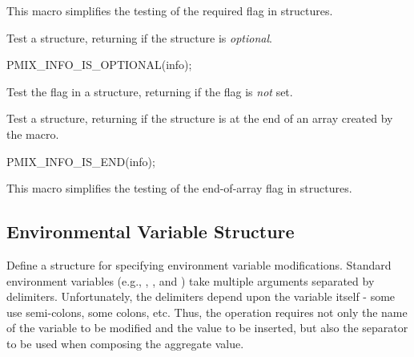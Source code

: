 This macro simplifies the testing of the required flag in  structures.


Test a  structure, returning  if the structure is \textit{optional}.

\cspecificstart
\begin{codepar}
PMIX_INFO_IS_OPTIONAL(info);
\end{codepar}
\cspecificend

\begin{arglist}
\end{arglist}

Test the  flag in a  structure, returning  if the flag is \textit{not} set.


Test a  structure, returning  if the structure is at the end of an array created by the  macro.

\cspecificstart
\begin{codepar}
PMIX_INFO_IS_END(info);
\end{codepar}
\cspecificend

\begin{arglist}
\end{arglist}

This macro simplifies the testing of the end-of-array flag in  structures.

\subsection{Environmental Variable Structure}

Define a structure for specifying environment variable modifications.
Standard environment variables (e.g., , , and )
take multiple arguments separated by delimiters. Unfortunately, the delimiters
depend upon the variable itself - some use semi-colons, some colons, etc. Thus,
the operation requires not only the name of the variable to be modified and
the value to be inserted, but also the separator to be used when composing
the aggregate value.

